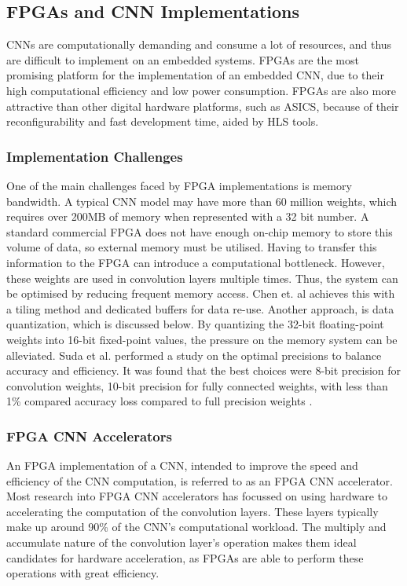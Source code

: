 \documentclass[12pt]{article}
\begin{document}
\subsection{FPGAs and CNN Implementations}
\label{sec:Background-FpgaCnnImpl}


CNNs are computationally demanding and consume a lot of resources, and thus are difficult to implement on an embedded systems. FPGAs are the most promising platform for the implementation of an embedded CNN, due to their high computational efficiency and low power consumption. FPGAs are also more attractive than other digital hardware platforms, such as ASICS, because of their reconfigurability and fast development time, aided by HLS tools.

\subsubsection{Implementation Challenges}
\label{sec:Background-FpgaCnnImpl-Challenges}


One of the main challenges faced by FPGA implementations is memory bandwidth. A typical CNN model may have more than 60 million weights, which requires over 200MB of memory when represented with a 32 bit number. A standard commercial FPGA does not have enough on-chip memory to store this volume of data, so external memory must be utilised. Having to transfer this information to the FPGA can introduce a computational bottleneck. However, these weights are used in convolution layers multiple times. Thus, the system can be optimised by reducing frequent memory access. Chen et. al achieves this with a tiling method and dedicated buffers for data re-use. Another approach, is data quantization, which is discussed below. By quantizing the 32-bit floating-point weights into 16-bit fixed-point values, the pressure on the memory system can be alleviated. Suda et al. performed a study on the optimal precisions to balance accuracy and efficiency. It was found that the best choices were 8-bit precision for convolution weights, 10-bit precision for fully connected weights, with less than 1\% compared accuracy loss compared to full precision weights \cite{SudaFpgaAccelerator}.

\subsubsection{FPGA CNN Accelerators}
\label{sec:Background-FpgaCnnImpl-Accel}


An FPGA implementation of a CNN, intended to improve the speed and efficiency of the CNN computation, is referred to as an FPGA CNN accelerator. Most research into FPGA CNN accelerators has focussed on using hardware to accelerating the computation of the convolution layers. These layers typically make up around 90\% of the CNN's computational workload. The multiply and accumulate nature of the convolution layer's operation makes them ideal candidates for hardware acceleration, as FPGAs are able to perform these operations with great efficiency. 
\end{document}
